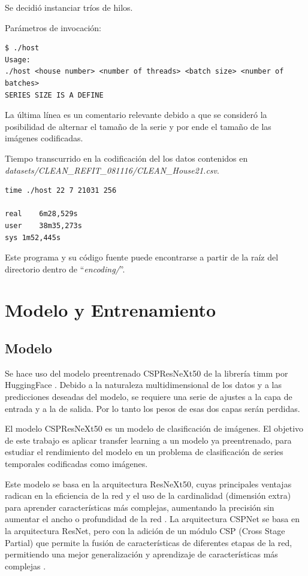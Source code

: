 Se decidió instanciar tríos de hilos. 

Parámetros de invocación:
\begin{lstlisting}
$ ./host
Usage: 
./host <house number> <number of threads> <batch size> <number of batches>
SERIES SIZE IS A DEFINE
\end{lstlisting}
La última línea es un comentario relevante debido a que se consideró la posibilidad de alternar el tamaño de la serie y por ende el tamaño de las imágenes codificadas. 

Tiempo transcurrido en la codificación del los datos contenidos en \\ \textit{datasets/CLEAN\_REFIT\_081116/CLEAN\_House21.csv}.
\begin{lstlisting}
time ./host 22 7 21031 256

real	6m28,529s
user	38m35,273s
sys	1m52,445s
\end{lstlisting}

Este programa y su código fuente puede encontrarse a partir de la raíz del directorio dentro de \enquote{\textit{encoding/}}.

\section{Modelo y Entrenamiento}
\subsection{Modelo}
Se hace uso del modelo preentrenado CSPResNeXt50 de la librería timm por HuggingFace \autocite{crunchbase2023huggingface}.
Debido a la naturaleza multidimensional de los datos y a las predicciones deseadas del modelo, se requiere una serie de ajustes a la capa de entrada y a la de salida. Por lo tanto los pesos de esas dos capas serán perdidas.

El modelo CSPResNeXt50 es un modelo de clasificación de imágenes. El objetivo de este trabajo es aplicar transfer learning a un modelo ya preentrenado, para estudiar el rendimiento del modelo en un problema de clasificación de series temporales codificadas como imágenes.

Este modelo se basa en la arquitectura ResNeXt50, cuyas principales ventajas radican en la eficiencia de la red y el uso de la cardinalidad (dimensión extra) para aprender características más complejas, aumentando la precisión sin aumentar el ancho o profundidad de la red \autocite{xie2017aggregated}.
La arquitectura CSPNet se basa en la arquitectura ResNet, pero con la adición de un módulo CSP (Cross Stage Partial) que permite la fusión de características de diferentes etapas de la red, permitiendo una mejor generalización y aprendizaje de características más complejas \autocite{wang2019cspnet}.

